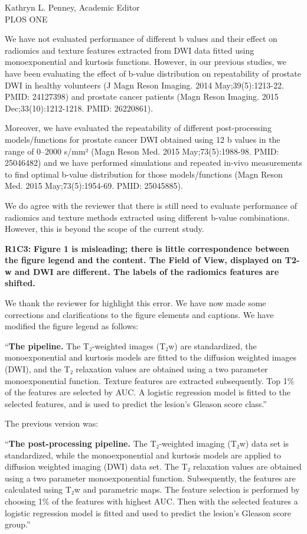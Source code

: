 \documentclass{letter}
\newenvironment{comment}[1]%
  {\vspace{5ex}\par\textbf{#1:}\ignorespaces\bfseries}%
  {\par\ignorespacesafterend}
\newenvironment{reply}%
  {\vspace{2ex}\par}%
  {\par\upshape}
\begin{document}
\begin{letter}{Kathryn L. Penney, Academic Editor \\ PLOS ONE}
\begin{reply}
We have not evaluated performance of different b values and their effect on radiomics and texture features extracted from DWI data fitted using monoexponential and kurtosis functions. However, in our previous studies, we have been evaluating the effect of b-value distribution on repeatability of prostate DWI in healthy volunteers (J Magn Reson Imaging. 2014 May;39(5):1213-22. PMID: 24127398) and prostate cancer patients (Magn Reson Imaging. 2015 Dec;33(10):1212-1218. PMID: 26220861).

Moreover, we have evaluated the repeatability of different post-processing models/functions for prostate cancer DWI obtained using 12 b values in the range of 0–2000 s/mm² (Magn Reson Med. 2015 May;73(5):1988-98. PMID: 25046482) and we have performed simulations and repeated in-vivo measurements to find optimal b-value distribution for those models/functions (Magn Reson Med. 2015 May;73(5):1954-69. PMID: 25045885).

We do agree with the reviewer that there is still need to evaluate performance of radiomics and texture methods extracted using different b-value combinations. However, this is beyond the scope of the current study. 
\end{reply}


\begin{comment}{R1C3}
Figure 1 is misleading; there is little correspondence between the figure legend
and the content. The Field of View, displayed on T2-w and DWI are different. The
labels of the radiomics features are shifted.
\end{comment}

\begin{reply}
We thank the reviewer for highlight this error. We have now made some corrections and clarifications to the figure elements and captions. We have modified the figure legend as follows:

``{\bf The pipeline.}
    The T₂-weighted images (T₂w) are standardized, the monoexponential and
    kurtosis models are fitted to the diffusion weighted images (DWI), and the
    T₂ relaxation values are obtained using a two parameter monoexponential
    function. Texture features are extracted subsequently. Top 1\% of the
    features are selected by AUC\@. A logistic regression model is fitted to the
    selected features, and is used to predict the lesion's Gleason score
    class.''

The previous version was:

``{\bf The post-processing pipeline.}
    The T₂-weighted imaging (T₂w) data set is standardized, while the
    monoexponential and kurtosis models are applied to diffusion weighted
    imaging (DWI) data set. The T₂ relaxation values are obtained using a two
    parameter monoexponential function. Subsequently, the features are
    calculated using T₂w and parametric maps. The feature selection is performed
    by choosing 1\% of the features with highest AUC\@. Then with the selected
    features a logistic regression model is fitted and used to predict the
    lesion's Gleason score group.''
\end{reply}



\end{letter}
\end{document}
